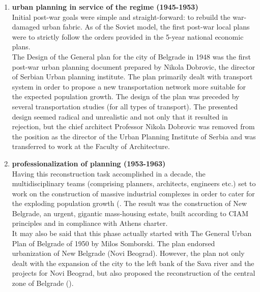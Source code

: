 \documentclass[11pt]{report}
\begin{document}
\begin{enumerate}
\item \textbf{urban planning in service of the regime (1945-1953)}
\\
Initial post-war goals were simple and straight-forward: to rebuild the war-damaged urban fabric. As of the Soviet model, the first post-war local plans were to strictly follow the orders provided in the 5-year national economic plans. 
\\

The Design of the General plan for the city of Belgrade in 1948 was the first post-war urban planning document prepared by Nikola Dobrovic, the director of Serbian Urban planning institute. The plan primarily dealt with transport system in order to propose a new transportation network more suitable for the expected population growth. The design of the plan was preceded by several transportation studies (for all types of transport). The presented design seemed radical and unrealistic and not only that it resulted in rejection, but the chief architect Professor Nikola Dobrovic was removed from the position as the director of the Urban Planning Institute of Serbia and was transferred to work at the Faculty of Architecture.

\item \textbf{professionalization of planning (1953-1963)}
\\
Having this reconstruction task accomplished in a decade, the multidisciplinary teams (comprising planners, architects, engineers etc.) set to work on the construction of massive industrial complexes in order to cater for the exploding population growth (\href{ref}{\citealt{hirt_belgrade_2009}}. The result was the construction of New Belgrade, an urgent, gigantic mass-housing estate, built according to CIAM principles and in compliance with Athens charter.
\\

It may also be said that this phase actually started with The  General  Urban  Plan  of  Belgrade of 1950 by Milos Somborski.
The plan endorsed urbanization of New Belgrade (Novi Beograd). However, the plan not only dealt with the expansion of the city to the left bank of the Sava river and the projects for Novi Beograd, but also proposed the reconstruction of the central zone of Belgrade (\href{ref}{\citealt{grozdanic_belgrade_2008}}).


\end{enumerate}
\end{document}
